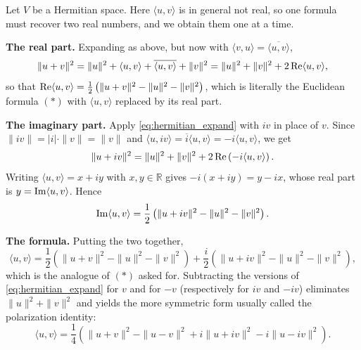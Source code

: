 \begin{exercisesolution*}
\label{sol:polarization_b}
  Let $V$ be a Hermitian space. Here $\langle u, v \rangle$ is in general not real, so one formula must recover two real numbers, and we obtain them one at a time.

  \textbf{The real part.} Expanding as above, but now with $\langle v, u \rangle = \overline{\langle u, v \rangle}$,
  \begin{equation} \label{eq:hermitian_expand}
    \|u+v\|^2 = \|u\|^2 + \langle u, v \rangle + \overline{\langle u, v \rangle} + \|v\|^2 = \|u\|^2 + \|v\|^2 + 2 \operatorname{Re} \langle u, v \rangle,
  \end{equation}
  so that $\operatorname{Re} \langle u, v \rangle = \frac{1}{2}\left( \|u+v\|^2 - \|u\|^2 - \|v\|^2 \right)$, which is literally the Euclidean formula $(*)$ with $\langle u, v \rangle$ replaced by its real part.

  \textbf{The imaginary part.} Apply \eqref{eq:hermitian_expand} with $iv$ in place of $v$. Since $\|iv\| = |i| \cdot \|v\| = \|v\|$ and $\langle u, iv \rangle = \overline{i} \langle u, v \rangle = -i \langle u, v \rangle$, we get
  \[ \|u + iv\|^2 = \|u\|^2 + \|v\|^2 + 2 \operatorname{Re} \left( -i \langle u, v \rangle \right). \]
  Writing $\langle u, v \rangle = x + iy$ with $x, y \in \mathbb{R}$ gives $-i(x+iy) = y - ix$, whose real part is $y = \operatorname{Im} \langle u, v \rangle$. Hence
  \[ \operatorname{Im} \langle u, v \rangle = \frac{1}{2}\left( \|u+iv\|^2 - \|u\|^2 - \|v\|^2 \right). \]

  \textbf{The formula.} Putting the two together,
  \[ \langle u, v \rangle = \frac{1}{2}\left( \|u+v\|^2 - \|u\|^2 - \|v\|^2 \right) + \frac{i}{2} \left( \|u+iv\|^2 - \|u\|^2 - \|v\|^2 \right), \]
  which is the analogue of $(*)$ asked for. Subtracting the versions of \eqref{eq:hermitian_expand} for $v$ and for $-v$ (respectively for $iv$ and $-iv$) eliminates $\|u\|^2 + \|v\|^2$ and yields the more symmetric form usually called the polarization identity:
  \[ \langle u, v \rangle = \frac{1}{4}\left( \|u+v\|^2 - \|u-v\|^2 + i\|u+iv\|^2 - i\|u-iv\|^2 \right). \]
\end{exercisesolution*}

